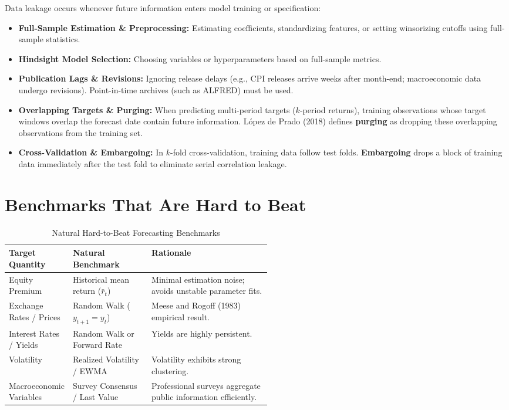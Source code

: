 Data leakage occurs whenever future information enters model training or specification:
\begin{itemize}
  \item \textbf{Full-Sample Estimation \& Preprocessing:} Estimating coefficients, standardizing features, or setting winsorizing cutoffs using full-sample statistics.
  \item \textbf{Hindsight Model Selection:} Choosing variables or hyperparameters based on full-sample metrics.
  \item \textbf{Publication Lags \& Revisions:} Ignoring release delays (e.g., CPI releases arrive weeks after month-end; macroeconomic data undergo revisions). Point-in-time archives (such as ALFRED) must be used.
  \item \textbf{Overlapping Targets \& Purging:} When predicting multi-period targets ($k$-period returns), training observations whose target windows overlap the forecast date contain future information. López de Prado (2018) defines \textbf{purging} as dropping these overlapping observations from the training set.
  \item \textbf{Cross-Validation \& Embargoing:} In $k$-fold cross-validation, training data follow test folds. \textbf{Embargoing} drops a block of training data immediately after the test fold to eliminate serial correlation leakage.
\end{itemize}

\section{Benchmarks That Are Hard to Beat}
\label{sec:05-benchmarks}

\begin{table}[htbp]
\centering
\small
\caption{Natural Hard-to-Beat Forecasting Benchmarks}
\label{tab:05-benchmarks}
\begin{tabularx}{0.95\linewidth}{@{}>{\raggedright\arraybackslash}p{0.22\linewidth}>{\raggedright\arraybackslash}p{0.30\linewidth}>{\raggedright\arraybackslash}X@{}}
\toprule
Target Quantity & Natural Benchmark & Rationale \\
\midrule
Equity Premium & Historical mean return ($\bar{r}_t$) & Minimal estimation noise; avoids unstable parameter fits. \\
Exchange Rates / Prices & Random Walk ($y_{t+1} = y_t$) & Meese and Rogoff (1983) empirical result. \\
Interest Rates / Yields & Random Walk or Forward Rate & Yields are highly persistent. \\
Volatility & Realized Volatility / EWMA & Volatility exhibits strong clustering. \\
Macroeconomic Variables & Survey Consensus / Last Value & Professional surveys aggregate public information efficiently. \\
\bottomrule
\end{tabularx}
\end{table}

